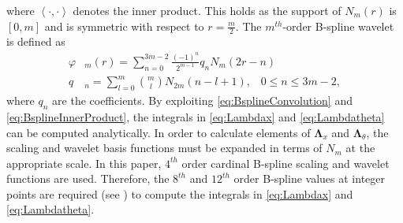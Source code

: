 \documentclass[journal]{IEEEtran}
\begin{document}
where $\left\langle \cdot,\cdot\right\rangle $ denotes the inner product. This holds as the support of $N_m\left(r\right)$ is $\left[ 0,m\right]$ and  is symmetric with respect to $r=\frac{m}{2}$. The $m^{th}$-order B-spline wavelet is defined as \cite{Chui1992}
\begin{align}
 \varphi & _{m}\left(r\right) = \sum_{n=0}^{3m-2} \frac{\left(-1\right)^n}{2^{m-1}}  q_n N_{m}\left(2r-n\right) \\
 q & _n = \sum_{l=0}^{m} \binom{m}{l} N_{2m}\left(n-l+1\right), \,  \text{ $0\le n\le 3m-2$},
\end{align}
where $q_n$ are the coefficients. By exploiting \eqref{eq:BsplineConvolution} and \eqref{eq:BsplineInnerProduct}, the integrals in \eqref{eq:Lambdax} and \eqref{eq:Lambdatheta} can be computed analytically. In order to calculate elements of $\boldsymbol\Lambda_{x}$ and $\boldsymbol\Lambda_{\theta}$, the scaling and wavelet basis functions must be expanded in terms of $N_m$ at the appropriate scale. In this paper, $4^{th}$ order cardinal B-spline scaling and wavelet functions are used. Therefore, the $8^{th}$ and $12^{th}$ order B-spline values at integer points are required (see \cite{Goswami1999}) to compute the integrals in \eqref{eq:Lambdax} and \eqref{eq:Lambdatheta}.
\end{document}
